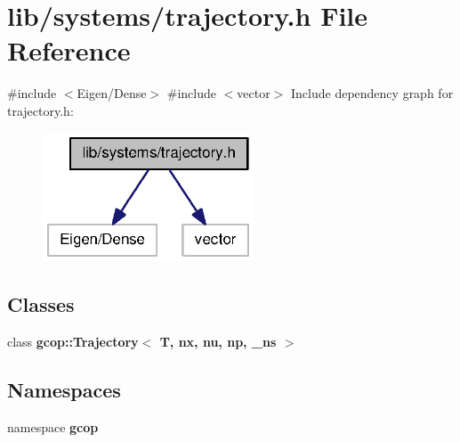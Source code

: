 \section{lib/systems/trajectory.h \-File \-Reference}
\label{trajectory_8h}
{\ttfamily \#include $<$\-Eigen/\-Dense$>$}\*
{\ttfamily \#include $<$vector$>$}\*
\-Include dependency graph for trajectory.\-h\-:
\nopagebreak
\begin{figure}[H]
\begin{center}
\leavevmode
\includegraphics[width=178pt]{trajectory_8h__incl}
\end{center}
\end{figure}
\subsection*{\-Classes}
\begin{DoxyCompactItemize}
\item 
class {\bf gcop\-::\-Trajectory$<$ T, nx, nu, np, \-\_\-ns $>$}
\end{DoxyCompactItemize}
\subsection*{\-Namespaces}
\begin{DoxyCompactItemize}
\item 
namespace {\bf gcop}
\end{DoxyCompactItemize}
